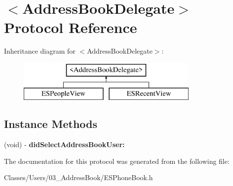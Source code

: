 \hypertarget{protocol_address_book_delegate-p}{}\section{$<$Address\+Book\+Delegate$>$ Protocol Reference}
\label{protocol_address_book_delegate-p}
Inheritance diagram for $<$Address\+Book\+Delegate$>$\+:\begin{figure}[H]
\begin{center}
\leavevmode
\includegraphics[height=2.000000cm]{protocol_address_book_delegate-p}
\end{center}
\end{figure}
\subsection*{Instance Methods}
\begin{DoxyCompactItemize}
\item 
\hypertarget{protocol_address_book_delegate-p_a85e11a625cc01daf58d133c1283a1ca0}{}(void) -\/ {\bfseries did\+Select\+Address\+Book\+User\+:}\label{protocol_address_book_delegate-p_a85e11a625cc01daf58d133c1283a1ca0}

\end{DoxyCompactItemize}


The documentation for this protocol was generated from the following file\+:\begin{DoxyCompactItemize}
\item 
Classes/\+Users/03\+\_\+\+Address\+Book/E\+S\+Phone\+Book.\+h\end{DoxyCompactItemize}
